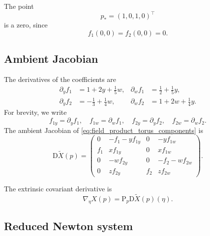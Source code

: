 \documentclass[11pt]{article}
\newcommand{\D}{\mathrm{D}}
\newcommand{\Proj}{\mathrm{P}}
\begin{document}
The point
\begin{equation}\label{eq:zero_product_torus}
    p_\ast=(1,0,1,0)^\top
\end{equation}
is a zero, since
\[
    f_1(0,0)=f_2(0,0)=0.
\]

\subsection*{Ambient Jacobian}

The derivatives of the coefficients are
\begin{align*}
    \partial_yf_1
    &=
    1+2y+\frac15w,
    &
    \partial_wf_1
    &=
    \frac12+\frac15y,\\
    \partial_yf_2
    &=
    -\frac13+\frac14w,
    &
    \partial_wf_2
    &=
    1+2w+\frac14y.
\end{align*}
For brevity, we write
\[
    f_{1y}=\partial_yf_1,\quad
    f_{1w}=\partial_wf_1,\quad
    f_{2y}=\partial_yf_2,\quad
    f_{2w}=\partial_wf_2.
\]
The ambient Jacobian of \eqref{eq:field_product_torus_components} is
\begin{equation}\label{eq:jacobian_product_torus}
    \D\widetilde X(p)
    =
    \begin{pmatrix}
        0&-f_1-yf_{1y}&0&-yf_{1w}\\
        f_1&xf_{1y}&0&xf_{1w}\\
        0&-wf_{2y}&0&-f_2-wf_{2w}\\
        0&zf_{2y}&f_2&zf_{2w}
    \end{pmatrix}.
\end{equation}

The extrinsic covariant derivative is
\[
    \nabla_\eta X(p)
    =
    \Proj_p\D\widetilde X(p)(\eta).
\]

\subsection*{Reduced Newton system}
\end{document}
